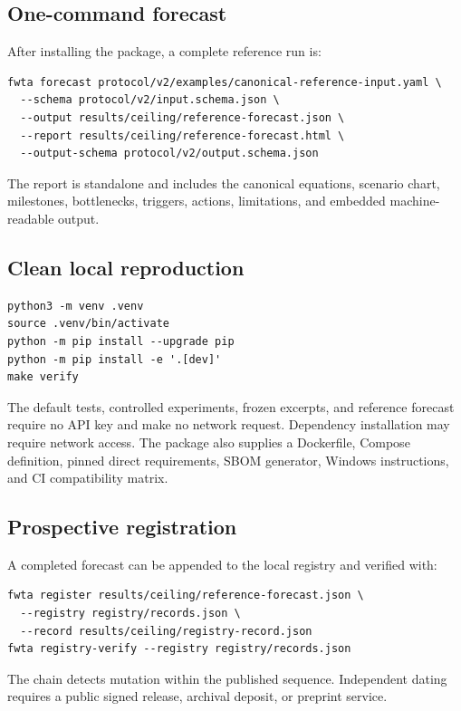 \subsection{One-command forecast}

After installing the package, a complete reference run is:
\begin{Verbatim}[fontsize=\small,frame=single,breaklines=true]
fwta forecast protocol/v2/examples/canonical-reference-input.yaml \
  --schema protocol/v2/input.schema.json \
  --output results/ceiling/reference-forecast.json \
  --report results/ceiling/reference-forecast.html \
  --output-schema protocol/v2/output.schema.json
\end{Verbatim}
The report is standalone and includes the canonical equations, scenario chart, milestones, bottlenecks, triggers, actions, limitations, and embedded machine-readable output.

\subsection{Clean local reproduction}

\begin{Verbatim}[fontsize=\small,frame=single]
python3 -m venv .venv
source .venv/bin/activate
python -m pip install --upgrade pip
python -m pip install -e '.[dev]'
make verify
\end{Verbatim}
The default tests, controlled experiments, frozen excerpts, and reference forecast require no API key and make no network request. Dependency installation may require network access. The package also supplies a Dockerfile, Compose definition, pinned direct requirements, SBOM generator, Windows instructions, and CI compatibility matrix.

\subsection{Prospective registration}

A completed forecast can be appended to the local registry and verified with:
\begin{Verbatim}[fontsize=\small,frame=single,breaklines=true]
fwta register results/ceiling/reference-forecast.json \
  --registry registry/records.json \
  --record results/ceiling/registry-record.json
fwta registry-verify --registry registry/records.json
\end{Verbatim}
The chain detects mutation within the published sequence. Independent dating requires a public signed release, archival deposit, or preprint service.

